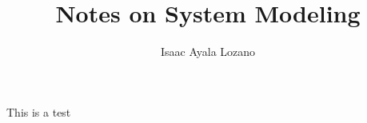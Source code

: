 \documentclass[12pt,letterpaper]{article}
\title{Notes on System Modeling}
\author{Isaac Ayala Lozano}
\date{}
\begin{document}

This is a test
\end{document}

